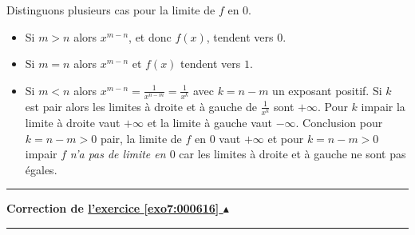 \documentclass[11pt,a4paper]{article}
\newcounter{exo}
\newcommand{\correction}[1]{\hypertarget{cor7:#1}{}\label{cor7:#1}{\bf Correction de \hyperlink{exo7:#1}{l'exercice \ref{exo7:#1} $\blacktriangle$}}\vspace{1mm}\hrule\vspace{1mm}}
\newcommand{\fincorrection}{\vspace{1mm}\hrule\vspace*{7mm}}
\begin{document}
Distinguons plusieurs cas pour la limite de $f$ en $0$.
\begin{itemize}
  \item Si $m > n$ alors $x^{m-n}$, et donc $f(x)$, tendent vers $0$.
  \item Si $m=n$ alors $x^{m-n}$ et $f(x)$ tendent vers $1$.
  \item Si $m < n$ alors $x^{m-n} = \frac 1 {x^{n-m}}  = \frac 1 {x^k}$ avec $k = n-m$ un exposant positif. Si $k$ est pair alors les limites 
\`a droite et \`a gauche de $\frac 1{x^k}$ sont $+\infty$. 
Pour $k$ impair la limite \`a droite vaut $+\infty$ et la limite \`a gauche vaut $-\infty$. Conclusion pour $k=n-m>0$ pair, la limite de $f$ en $0$ vaut $+\infty$ et pour $k = n-m>0$ impair $f$ \emph{n'a pas de limite en $0$} car les limites \`a droite et \`a gauche ne sont pas \'egales.
\end{itemize}
\fincorrection
\correction{000616}
\end{document}
